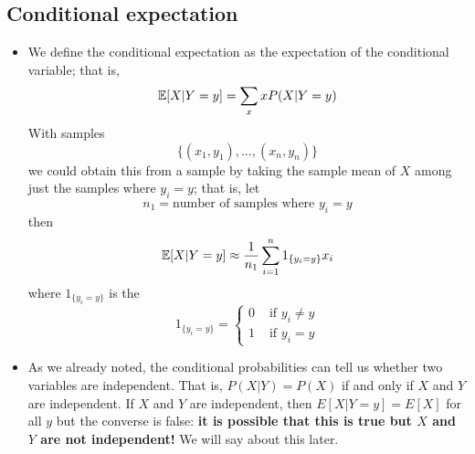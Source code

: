 \subsection{Conditional expectation}
\begin{itemize}
\item We define the conditional expectation as the expectation of the conditional variable; that is, 
\begin{equation*}
\mathbb E[X|Y=y] = \sum_{x} xP(X|Y=y)
\end{equation*}
With samples
\begin{equation*}
\{(x_1,y_1),\dots,(x_n,y_n)\}
\end{equation*}
 we could obtain this from a sample by taking the sample mean of $X$ among just the samples where $y_i = y$; that is, let 
 \begin{equation*}
 n_1 = \text{number of samples where $y_i = y$}
 \end{equation*}
 then 
 \begin{equation*}
 \mathbb E[X|Y=y] \approx  \frac{1}{n_1}\sum_{i=1}^n1_{\{y_i = y\}}x_i
 \end{equation*}
 where $1_{\{y_i = y\}}$ is the 
 \begin{equation*}
 1_{\{y_i = y\}} = \left\{ \begin{array}{cc}
 0 & \text{ if } y_i\ne y\\
  1 & \text{ if } y_i=y
  \end{array}\right.
 \end{equation*}
 \item As we already noted, the conditional probabilities can tell us whether two variables are independent. That is, $P(X|Y) = P(X)$ if and only if $X$ and $Y$ are independent. If $X$ and $Y$ are independent, then $E[X|Y=y]= E[X]$ for all $y$ but the converse is false: {\bf it is possible that this is true but $X$ and $Y$ are not independent!} We will say about this later.  
\end{itemize}




